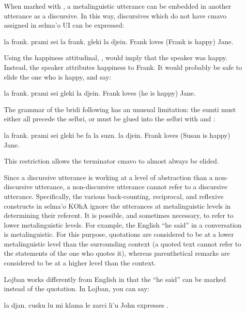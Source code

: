 When marked with , a metalinguistic utterance can be
    embedded in another utterance as a discursive. In this way,
    discursives which do not have cmavo assigned in selma'o UI can
    be expressed:
\begin{example}
la frank. prami sei la frank. gleki la djein.\n
Frank loves (Frank is happy) Jane.
\end{example}

Using the happiness attitudinal, , would imply that
    the speaker was happy. Instead, the speaker attributes
    happiness to Frank. It would probably be safe to elide the one
    who is happy, and say:
\begin{example}
la frank. prami sei gleki la djein.\n
Frank loves (he is happy) Jane.
\end{example}

The grammar of the bridi following  has an unusual
    limitation: the sumti must either all precede the selbri, or
    must be glued into the selbri with  and :
\begin{example}
la frank. prami sei gleki be fa la suzn. la djein.\n
Frank loves (Susan is happy) Jane.
\end{example}

This restriction allows the terminator cmavo  to
    almost always be elided.

Since a discursive utterance is working at a 
    level of abstraction than a non-discursive utterance, a
    non-discursive utterance cannot refer to a discursive
    utterance. Specifically, the various back-counting, reciprocal,
    and reflexive constructs in selma'o KOhA ignore the utterances
    at  metalinguistic levels in determining their
    referent. It is possible, and sometimes necessary, to refer to
    lower metalinguistic levels. For example, the English ``he
    said'' in a conversation is metalinguistic. For this purpose,
    quotations are considered to be at a lower metalinguistic level
    than the surrounding context (a quoted text cannot refer to the
    statements of the one who quotes it), whereas parenthetical
    remarks are considered to be at a higher level than the
    context.

Lojban works differently from English in that the ``he
    said'' can be marked instead of the quotation. In Lojban, you
    can say:
\begin{example}
la djan. cusku lu mi klama le zarci li'u\n
John expresses .
\end{example}

